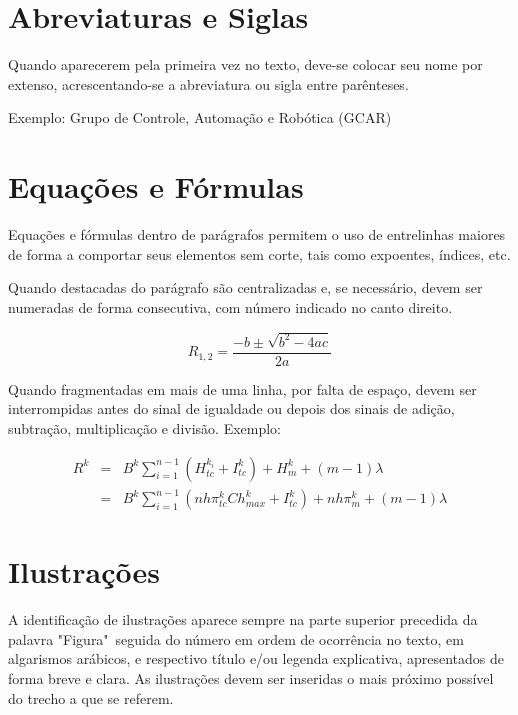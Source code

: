 \documentclass[repeatfields,xlists,xpacks,oneside,yearsonly]{ufrgscca}
\begin{document}
\begin{appendix}
        \section{Abreviaturas e Siglas}

        Quando aparecerem pela primeira vez no texto, deve-se colocar seu nome por
        extenso, acrescentando-se a abreviatura ou sigla entre parênteses.

        Exemplo:   Grupo de Controle, Automação e Robótica (GCAR)

        \section{Equações e Fórmulas}

        Equações e fórmulas dentro de parágrafos permitem o uso de entrelinhas
        maiores de forma a comportar seus elementos sem corte, tais como expoentes,
        índices, etc.

        Quando destacadas do parágrafo são centralizadas e, se necessário, devem ser
        numeradas de forma consecutiva, com número indicado no canto direito.

        \begin{equation}
            R_{1,2}=\frac{-b\pm\sqrt{b^2-4ac}}{2a}
        \end{equation}

        Quando fragmentadas em mais de uma linha, por falta de espaço, devem ser
        interrompidas antes do sinal de igualdade ou depois dos sinais de adição,
        subtração, multiplicação e divisão. Exemplo:

        \begin{eqnarray}
            R^k &=& B^k \sum_{i=1}^{n-1}{\left(H_{tc}^{k_i}+I_{tc}^k\right)}+H_m^k+(m-1)\lambda \nonumber\\
            &=& B^k \sum_{i=1}^{n-1}{\left(nh\pi_{tc}^kCh_{max}^k+I_{tc}^k\right)}+nh\pi_m^k+(m-1)\lambda
        \end{eqnarray}


        \section{Ilustrações}

        A identificação de ilustrações aparece sempre na parte superior precedida da
        palavra "Figura"\ seguida do número em ordem de ocorrência no texto, em
        algarismos arábicos, e respectivo título e/ou legenda explicativa,
        apresentados de forma breve e clara. As ilustrações devem ser inseridas o
        mais próximo possível do trecho a que se referem.


\end{appendix}
\end{document}
